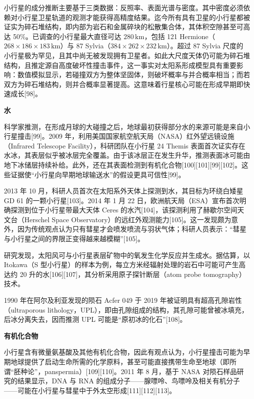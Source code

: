 小行星的成分推断主要基于三类数据：反照率、表面光谱与密度。其中密度必须依赖对小行星卫星轨道的观测才能获得高精度结果。迄今所有具有卫星的小行星都被证实为碎石堆结构，即内部为岩石和金属碎块的松散集合体，其体积空隙甚至可高达 50\%。已调查的小行星最大直径可达 \(280\,\mathrm{km}\)，包括 121 Hermione（\(268\times186\times183\,\mathrm{km}\)）与 87 Sylvia（\(384\times262\times232\,\mathrm{km}\)）。超过 87 Sylvia 尺度的小行星极为罕见，且其中尚无被发现拥有卫星者。如此大尺度天体仍可能为碎石堆结构，且推定源自高度破坏性撞击事件，这一事实对太阳系形成模型具有重要影响：数值模拟显示，若碰撞双方为整体坚固体，则破坏概率与并合概率相当；而若双方为碎石堆结构，则并合概率显著提高。这意味着行星核心可能在形成早期即快速成长[98]。

\textbf{水}  

科学家推测，在形成月球的大碰撞之后，地球最初获得部分水的来源可能是来自小行星撞击[99]。2009 年，利用美国国家航空航天局（NASA）红外望远镜设施（Infrared Telescope Facility），科研团队在小行星 24 Themis 表面首次证实存在水冰，其表层似乎被冰层完全覆盖。由于该冰层正在发生升华，推测表面冰可能由地下冰储层持续补给。此外，还在其表面检测到有机化合物[100][101][99][102]。这些证据使“小行星向早期地球输送水”的假设更具可信性[99]。

2013 年 10 月，科研人员首次在太阳系外天体上探测到水，其目标为环绕白矮星 GD 61 的一颗小行星[103]。2014 年 1 月 22 日，欧洲航天局（ESA）宣布首次明确探测到位于小行星带最大天体 Ceres 的水汽[104]，该探测利用了赫歇尔空间天文台（Herschel Space Observatory）的远红外观测能力[105]。这一发现颇为意外，因为传统观点认为只有彗星才会喷发喷流与羽状气体；科研人员表示：“彗星与小行星之间的界限正变得越来越模糊”[105]。

研究发现，太阳风可与小行星表层矿物中的氧发生化学反应并生成水。据估算，以 Itokawa（S 型小行星）的样本为例，每立方米经辐射处理的岩石中可能可产生高达约 20 升的水[106][107]，其分析采用原子探针断层（atom probe tomography）技术。

1990 年在阿尔及利亚发现的陨石 Acfer 049 于 2019 年被证明具有超高孔隙岩性（ultraporous lithology，UPL），即由孔隙组成的结构，其孔隙可能曾被冰填充，后冰分离失去，因而推测 UPL 可能是“原初冰的化石”[108]。

\textbf{有机化合物}

小行星含有微量氨基酸及其他有机化合物，因此有观点认为，小行星撞击可能为早期地球提供了启动生命所需的化学原料，甚至可能直接携带生命至地球（即所谓“胚种论”，panspermia）[109][110]。2011 年 8 月，基于 NASA 对陨石样品研究的结果显示，DNA 与 RNA 的组成分子——腺嘌呤、鸟嘌呤及相关有机分子——可能在小行星与彗星中于外太空形成[111][112][113]。

